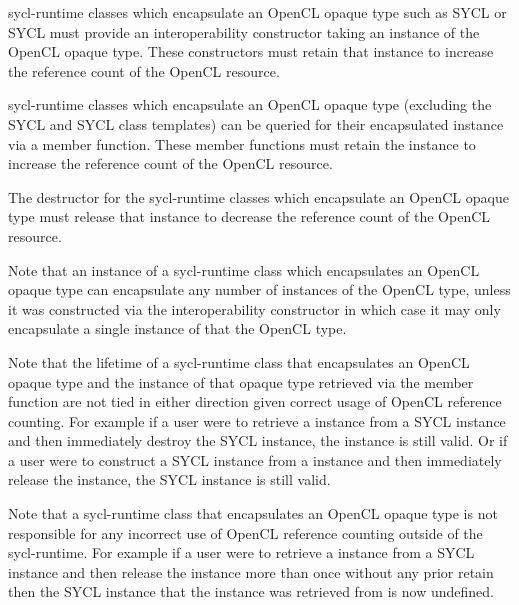 
\gls{sycl-runtime} classes which encapsulate an OpenCL opaque type such as SYCL  or SYCL  must provide an interoperability constructor taking an instance of the OpenCL opaque type.
These constructors must retain that instance to increase the reference count of the OpenCL resource.

\gls{sycl-runtime} classes which encapsulate an OpenCL opaque type (excluding the SYCL  and SYCL  class templates) can be queried for their encapsulated instance via a  member function. These  member functions must retain the instance to increase the reference count of the OpenCL resource.

The destructor for the \gls{sycl-runtime} classes which encapsulate an OpenCL opaque type must release that instance to decrease the reference count of the OpenCL resource.

Note that an instance of a \gls{sycl-runtime} class which encapsulates an OpenCL opaque type can encapsulate any number of instances of the OpenCL type, unless it was constructed via the interoperability constructor in which case it may only encapsulate a single instance of that the OpenCL type.

Note that the lifetime of a \gls{sycl-runtime} class that encapsulates an OpenCL opaque type and the instance of that opaque type retrieved via the  member function are not tied in either direction given correct usage of OpenCL reference counting. For example if a user were to retrieve a  instance from a SYCL  instance and then immediately destroy the SYCL  instance, the  instance is still valid. Or if a user were to construct a SYCL  instance from a  instance and then immediately release the  instance, the SYCL  instance is still valid.

Note that a \gls{sycl-runtime} class that encapsulates an OpenCL opaque type is not responsible for any incorrect use of OpenCL reference counting outside of the \gls{sycl-runtime}. For example if a user were to retrieve a  instance from a SYCL  instance and then release the  instance more than once without any prior retain then the SYCL  instance that the  instance was retrieved from is now undefined.

